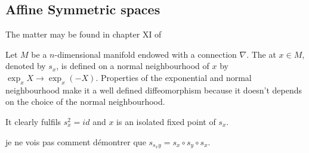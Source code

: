 %
%
%


\subsection{Affine Symmetric spaces}

The matter may be found in chapter XI of \cite{kobayashi2}

Let $M$ be a $n$-dimensional manifold endowed with a connection $\nabla$. The  at $x\in M$, denoted by $s_x$, is defined on a normal neighbourhood of $x$ by $\exp_x X\to\exp_x(-X)$. Properties of the exponential and normal neighbourhood make it a well defined diffeomorphism because it doesn't depends on the choice of the normal neighbourhood.

It clearly fulfils $s_x^2=id$ and $x$ is an isolated fixed point of $s_x$.

\begin{probleme}
je ne vois pas comment démontrer que $s_{s_xy}=s_x\circ s_y\circ s_x$.
\end{probleme}

